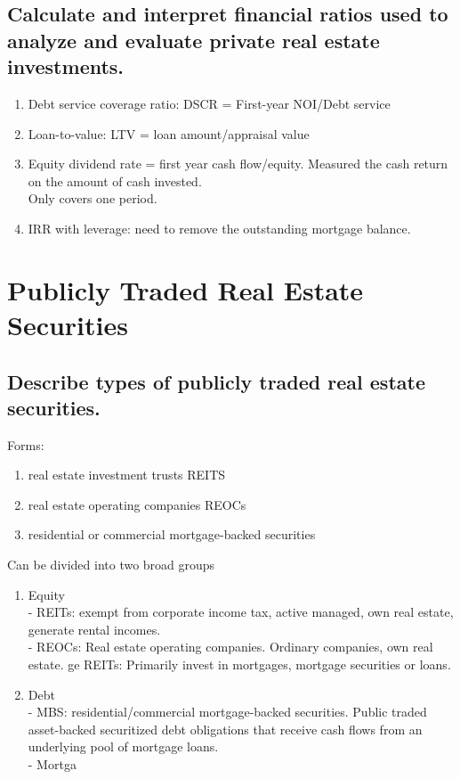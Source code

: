 \documentclass{article}
\newcommand{\be}{\begin{enumerate}}
\newcommand{\ee}{\end{enumerate}}
\begin{document}
\subsection{Calculate and interpret financial ratios used to analyze and evaluate
private real estate investments.}
\be
    \item Debt service coverage ratio: DSCR = First-year NOI/Debt service
    \item Loan-to-value: LTV = loan amount/appraisal value
    \item Equity dividend rate = first year cash flow/equity. Measured the cash return
    on the amount of cash invested.
    \\Only covers one period.
    \item IRR with leverage: need to remove the outstanding mortgage balance.
\ee



\section{Publicly Traded Real Estate Securities}
\subsection{Describe types of publicly traded real estate securities.}
Forms:
\be
    \item real estate investment trusts REITS
    \item real estate operating companies REOCs
    \item residential or commercial mortgage-backed securities
\ee
Can be divided into two broad groups
\be
    \item Equity
                \\ - REITs: exempt from corporate income tax, active managed, own real estate, generate rental incomes.
                \\ - REOCs: Real estate operating companies. Ordinary companies, own real estate.
            ge REITs: Primarily invest in mortgages, mortgage securities or loans.
    \item Debt
                \\ - MBS: residential/commercial mortgage-backed securities. Public traded asset-backed
                securitized debt obligations that receive cash flows from an underlying pool of
                mortgage loans.
                \\ - Mortga
\ee
\end{document}
